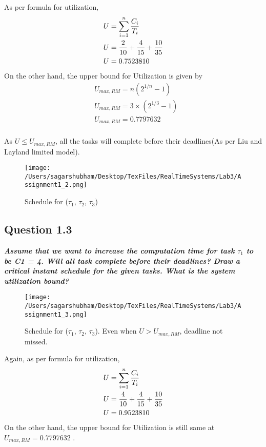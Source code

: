\documentclass[oneside,a4paper]{article}
\begin{document}
As per formula for utilization,
\begin{align*}
& U = \sum_{i=1}^{n} \frac{C_i}{T_i}  \\ 
& U = \frac{2}{10} + \frac{4}{15} + \frac{10}{35}\\
& U = 0.7523810  \hfill\\
\end{align*}
On the other hand, the upper bound for Utilization is given by 
\begin{align*}
& U_{max,RM} = n(2^{1/n} - 1) \\
& U_{max,RM} = 3\times(2^{1/3} - 1) \\
& U_{max,RM} = 0.7797632 \\
\end{align*}\par
As $U \leq U_{max,RM}$, all the tasks will complete before their deadlines(As per Liu and Layland limited model).
\begin{figure}[H]
                    \centering
                    \texttt{[image: /Users/sagarshubham/Desktop/TexFiles/RealTimeSystems/Lab3/Assignment1\_2.png]}
                    \caption[Figure for Question 1.2]{Schedule for ($\tau_1$, $\tau_2$, $\tau_3$)}
                    \label{figure1}        
\end{figure}\par
\pagebreak
\subsection*{\normalsize{Question 1.3}}
\textit{\textbf{Assume that we want to increase the computation time for task $\tau_1$ to be C1 = 4. Will all task complete before their deadlines? Draw a critical instant schedule for the given tasks. What is the system utilization bound?}}\par
\begin{figure}[H]
                    \centering
                    \texttt{[image: /Users/sagarshubham/Desktop/TexFiles/RealTimeSystems/Lab3/Assignment1\_3.png]}
                    \caption[Figure for Question 1.3]{Schedule for ($\tau_1$, $\tau_2$, $\tau_3$). Even when $U > U_{max,RM}$, deadline not missed.}
                    \label{figure2}        
\end{figure}\par
Again, as per formula for utilization, 
\begin{align*}
& U = \sum_{i=1}^{n} \frac{C_i}{T_i}  \\ 
& U = \frac{4}{10} + \frac{4}{15} + \frac{10}{35}\\
& U = 0.9523810  \hfill\\
\end{align*}
On the other hand, the upper bound for Utilization is still same at $ U_{max,RM} = 0.7797632 $ .
\end{document}
